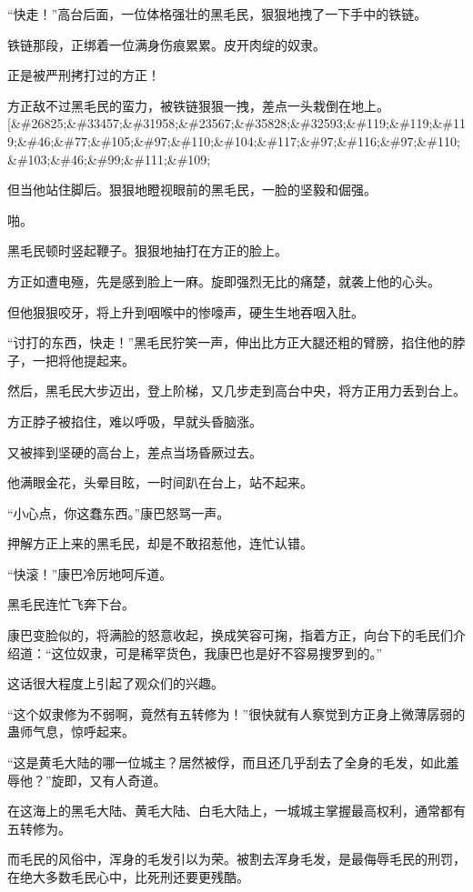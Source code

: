\begin{this_body}
“快走！”高台后面，一位体格强壮的黑毛民，狠狠地拽了一下手中的铁链。

铁链那段，正绑着一位满身伤痕累累。皮开肉绽的奴隶。

正是被严刑拷打过的方正！

方正敌不过黑毛民的蛮力，被铁链狠狠一拽，差点一头栽倒在地上。[\&\#26825;\&\#33457;\&\#31958;\&\#23567;\&\#35828;\&\#32593;\&\#119;\&\#119;\&\#119;\&\#46;\&\#77;\&\#105;\&\#97;\&\#110;\&\#104;\&\#117;\&\#97;\&\#116;\&\#97;\&\#110;\&\#103;\&\#46;\&\#99;\&\#111;\&\#109;

但当他站住脚后。狠狠地瞪视眼前的黑毛民，一脸的坚毅和倔强。

啪。

黑毛民顿时竖起鞭子。狠狠地抽打在方正的脸上。

方正如遭电殛，先是感到脸上一麻。旋即强烈无比的痛楚，就袭上他的心头。

但他狠狠咬牙，将上升到咽喉中的惨嚎声，硬生生地吞咽入肚。

“讨打的东西，快走！”黑毛民狞笑一声，伸出比方正大腿还粗的臂膀，掐住他的脖子，一把将他提起来。

然后，黑毛民大步迈出，登上阶梯，又几步走到高台中央，将方正用力丢到台上。

方正脖子被掐住，难以呼吸，早就头昏脑涨。

又被摔到坚硬的高台上，差点当场昏厥过去。

他满眼金花，头晕目眩，一时间趴在台上，站不起来。

“小心点，你这蠢东西。”康巴怒骂一声。

押解方正上来的黑毛民，却是不敢招惹他，连忙认错。

“快滚！”康巴冷厉地呵斥道。

黑毛民连忙飞奔下台。

康巴变脸似的，将满脸的怒意收起，换成笑容可掬，指着方正，向台下的毛民们介绍道：“这位奴隶，可是稀罕货色，我康巴也是好不容易搜罗到的。”

这话很大程度上引起了观众们的兴趣。

“这个奴隶修为不弱啊，竟然有五转修为！”很快就有人察觉到方正身上微薄孱弱的蛊师气息，惊呼起来。

“这是黄毛大陆的哪一位城主？居然被俘，而且还几乎刮去了全身的毛发，如此羞辱他？”旋即，又有人奇道。

在这海上的黑毛大陆、黄毛大陆、白毛大陆上，一城城主掌握最高权利，通常都有五转修为。

而毛民的风俗中，浑身的毛发引以为荣。被割去浑身毛发，是最侮辱毛民的刑罚，在绝大多数毛民心中，比死刑还要更残酷。


\end{this_body}
